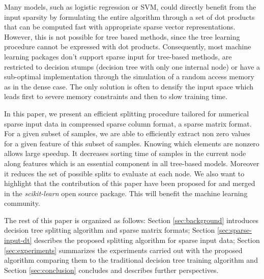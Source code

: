 Many models, such as logistic regression or SVM, could directly
benefit from the input sparsity by formulating the entire algorithm
through a set of dot products that can be computed fast with
appropriate sparse vector representations. However, this is not
possible for tree based methods, since the tree learning procedure
cannot be expressed with dot products. Consequently, most machine
learning packages don't support sparse input for tree-based methods,
are restricted to decision stumps (decision tree with only one
internal node) or have a sub-optimal implementation through the
simulation of a random access memory as in the dense case. The only
solution is often to densify the input space which leads first to
severe memory constraints and then to slow training time.

In this paper, we present an efficient splitting procedure tailored for
numerical sparse input data in compressed sparse column format, a sparse matrix
format. For a given subset of samples, we are able to efficiently extract non
zero values for a given feature of this subset of samples. Knowing which
elements are nonzero allows large speedup. It decreases sorting time of
samples in the current node along features which is an essential component in
all tree-based models. Moreover it reduces the set of possible splits to
evaluate at each node. We also want to highlight that the contribution of this
paper have been proposed for and merged in the \emph{scikit-learn}
\cite{buitinck2013api,pedregosa2011scikit} open source package. This will
benefit the machine learning community.

The rest of this paper is organized as follows: Section \ref{sec:background}
introduces decision tree splitting algorithm and sparse matrix formats; Section
\ref{sec:sparse-input-dt} describes the proposed splitting algorithm for sparse
input data; Section \ref{sec:experiments} summarizes the experiments carried out with the proposed algorithm comparing them to the traditional decision tree training algorithm
and Section \ref{sec:conclusion} concludes and describes further
perspectives.

